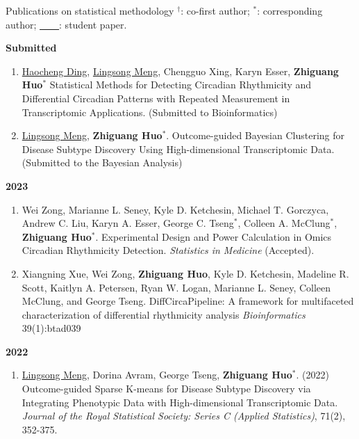 \documentclass{resume} %
\begin{document}
\begin{rSection}{Publications on statistical methodology}
$^\dagger$: co-first author; $^*$: corresponding author; \underline{\mbox{ }\mbox{ }\mbox{ }\mbox{ }}: student paper.

\textbf{Submitted}
\begin{enumerate}[noitemsep,topsep=0pt]

\item \underline{Haocheng Ding}, \underline{Lingsong Meng}, Chengguo Xing, Karyn Esser, {\bf Zhiguang Huo}$^*$
Statistical Methods for Detecting Circadian Rhythmicity and Differential Circadian Patterns with Repeated Measurement in Transcriptomic Applications.
(Submitted to Bioinformatics)

\item
\underline{Lingsong Meng}, {\bf Zhiguang Huo}$^*$. Outcome-guided Bayesian Clustering for Disease Subtype Discovery Using High-dimensional Transcriptomic Data. 
(Submitted to the Bayesian Analysis)

\end{enumerate}


\textbf{2023}
\begin{enumerate}[noitemsep,topsep=0pt, resume]

\item
Wei Zong, Marianne L. Seney, Kyle D. Ketchesin, Michael T. Gorczyca, Andrew C. Liu, Karyn A. Esser, George C. Tseng$^*$, Colleen A. McClung$^*$,  {\bf Zhiguang Huo}$^*$. 
Experimental Design and Power Calculation in Omics Circadian Rhythmicity Detection. 
\emph{Statistics in Medicine} (Accepted). 



\item Xiangning Xue, Wei Zong, {\bf Zhiguang Huo}, Kyle D. Ketchesin, Madeline R. Scott, Kaitlyn A. Petersen, Ryan W. Logan, Marianne L. Seney, Colleen McClung, and George Tseng.
DiffCircaPipeline: A framework for multifaceted characterization of differential rhythmicity analysis
\emph{Bioinformatics} 39(1):btad039


\end{enumerate}



\textbf{2022}
\begin{enumerate}[noitemsep,topsep=0pt, resume]

\item
\underline{Lingsong Meng}, Dorina Avram, George Tseng, {\bf Zhiguang Huo}$^*$.  (2022)
Outcome-guided Sparse K-means for Disease Subtype Discovery via Integrating Phenotypic Data with High-dimensional Transcriptomic Data.
\emph{Journal of the Royal Statistical Society: Series C (Applied Statistics)}, 71(2), 352-375.


\end{enumerate}
\end{rSection}
\end{document}
